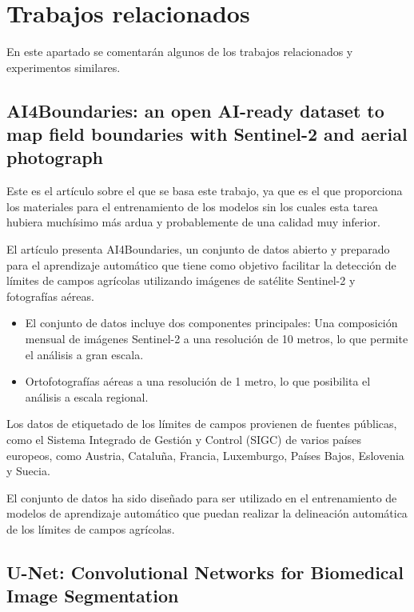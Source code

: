 \chapter{Trabajos relacionados}
En este apartado se comentarán algunos de los trabajos relacionados y experimentos similares.

\section{AI4Boundaries: an open AI-ready dataset to map field boundaries with Sentinel-2 and aerial photograph \cite{AI4boundaries}}

Este es el artículo sobre el que se basa este trabajo, ya que es el que proporciona los materiales para el entrenamiento de los modelos sin los cuales esta tarea hubiera muchísimo más ardua y probablemente de una calidad muy inferior.

El artículo presenta AI4Boundaries, un conjunto de datos abierto y preparado para el aprendizaje automático que tiene como objetivo facilitar la detección de límites de campos agrícolas utilizando imágenes de satélite Sentinel-2 y fotografías aéreas.
\begin{itemize}

	\item El conjunto de datos incluye dos componentes principales:
	Una composición mensual de imágenes Sentinel-2 a una resolución de 10 metros, lo que permite el análisis a gran escala.
	
	\item Ortofotografías aéreas a una resolución de 1 metro, lo que posibilita el análisis a escala regional.
\end{itemize}

Los datos de etiquetado de los límites de campos provienen de fuentes públicas, como el Sistema Integrado de Gestión y Control (SIGC) de varios países europeos, como Austria, Cataluña, Francia, Luxemburgo, Países Bajos, Eslovenia y Suecia.

El conjunto de datos ha sido diseñado para ser utilizado en el entrenamiento de modelos de aprendizaje automático que puedan realizar la delineación automática de los límites de campos agrícolas.

\section{U-Net: Convolutional Networks for Biomedical Image Segmentation \cite{Unet}}


